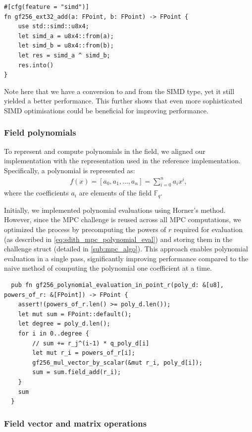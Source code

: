 \documentclass[11pt]{report}
\theoremstyle{definition}
\theoremstyle{plain}
\begin{document}
\begin{verbatim}
#[cfg(feature = "simd")]
fn gf256_ext32_add(a: FPoint, b: FPoint) -> FPoint {
    use std::simd::u8x4;
    let simd_a = u8x4::from(a);
    let simd_b = u8x4::from(b);
    let res = simd_a ^ simd_b;
    res.into()
}
\end{verbatim}
\noindent Note here that we have a conversion to and from the SIMD type, yet it still yielded a better performance. This further shows that even more sophisticated SIMD optimisations could be beneficial for improving performance. 

\subsubsection{Field polynomials}\label{sub:field_polynomials}
To represent and compute polynomials in the field, we aligned our implementation with the representation used in the reference implementation. Specifically, a polynomial is represented as:
\begin{align*}
  f(x) = [a_0, a_1, \dots, a_n] = \sum_{i=0}^{n} a_i x^i,
\end{align*}
where the coefficients $a_i$ are elements of the field $\mathbb{F}_{q}$.

Initially, we implemented polynomial evaluations using Horner's method. However, since the MPC challenge is reused across all MPC computations, we optimized the process by precomputing the powers of $r$ required for evaluation (as described in \autoref{eq:sdith_mpc_polynomial_eval}) and storing them in the challenge struct (detailed in \autoref{sub:mpc_algo}). This approach enables polynomial evaluation in a single pass, significantly improving performance compared to the naive method of computing the polynomial one coefficient at a time.
\begin{verbatim}
  pub fn gf256_polynomial_evaluation_in_point_r(poly_d: &[u8], powers_of_r: &[FPoint]) -> FPoint {
    assert!(powers_of_r.len() >= poly_d.len());
    let mut sum = FPoint::default();
    let degree = poly_d.len();
    for i in 0..degree {
        // sum += r_j^(i-1) * q_poly_d[i]
        let mut r_i = powers_of_r[i];
        gf256_mul_vector_by_scalar(&mut r_i, poly_d[i]);
        sum = sum.field_add(r_i);
    }
    sum
  }
\end{verbatim}

\subsubsection{Field vector and matrix operations}\label{sub:field_vector_operations}
\end{document}
